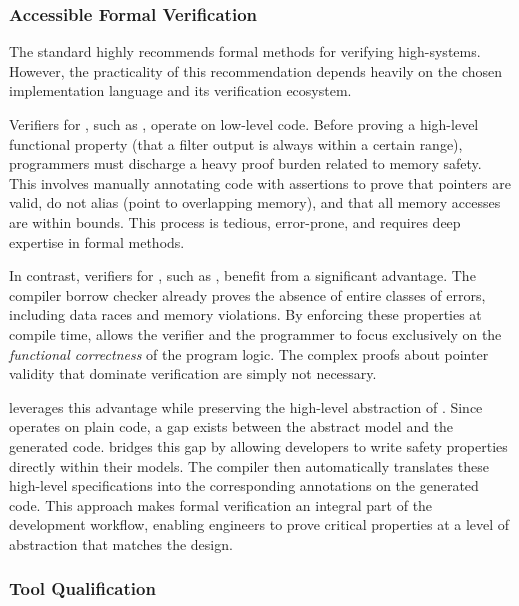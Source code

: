 \subsubsection{Accessible Formal Verification}
\label{sec:grust:implem:design_principles:verif}

The \iso standard highly recommends formal methods for verifying high-\Asil systems. However, the
practicality of this recommendation depends heavily on the chosen implementation language and its
verification ecosystem.

Verifiers for \Ci, such as \FramaC, operate on low-level code. Before proving a high-level
functional property (\eg that a filter output is always within a certain range), programmers must
discharge a heavy proof burden related to memory safety. This involves manually annotating code with
assertions to prove that pointers are valid, do not alias (point to overlapping memory), and that
all memory accesses are within bounds. This process is tedious, error-prone, and requires deep
expertise in formal methods.

In contrast, verifiers for \Rust, such as \Creusot, benefit from a significant advantage. The \Rust
compiler borrow checker already proves the absence of entire classes of errors, including data races
and memory violations. By enforcing these properties at compile time, \Rust allows the verifier and
the programmer to focus exclusively on the \emph{functional correctness} of the program logic. The
complex proofs about pointer validity that dominate \Ci verification are simply not necessary.

\GReusot leverages this advantage while preserving the high-level abstraction of \GRust. Since
\Creusot operates on plain \Rust code, a gap exists between the abstract \GRust model and the
generated code. \GReusot bridges this gap by allowing developers to write safety properties directly
within their \GRust models. The compiler then automatically translates these high-level
specifications into the corresponding \Creusot annotations on the generated \Rust code. This
approach makes formal verification an integral part of the development workflow, enabling engineers
to prove critical properties at a level of abstraction that matches the design.

\subsubsection{Tool Qualification}
\label{sec:grust:implem:design_principles:qualif}

